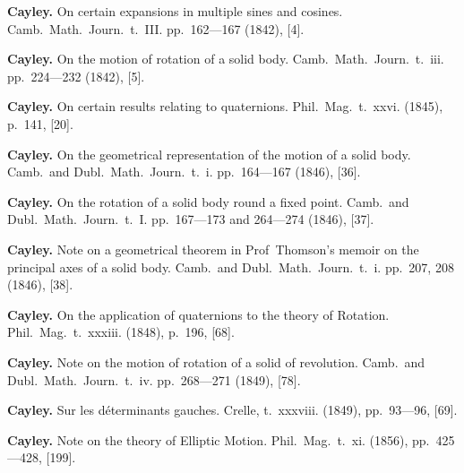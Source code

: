 \documentclass[11pt,a4paper]{book}
\begin{document}
\vspace{0.5em}

\noindent\textbf{Cayley.} On certain expansions in multiple sines and cosines. Camb.~Math.~Journ.~t.~III. pp.~162---167 (1842), [4].

\vspace{0.5em}

\noindent\textbf{Cayley.} On the motion of rotation of a solid body. Camb.~Math.~Journ.~t.~iii. pp.~224---232 (1842), [5].

\vspace{0.5em}

\noindent\textbf{Cayley.} On certain results relating to quaternions. Phil.~Mag.~t.~xxvi. (1845), p.~141, [20].

\vspace{0.5em}

\noindent\textbf{Cayley.} On the geometrical representation of the motion of a solid body. Camb.~and Dubl.~Math.~Journ.~t.~i. pp.~164---167 (1846), [36].

\vspace{0.5em}

\noindent\textbf{Cayley.} On the rotation of a solid body round a fixed point. Camb.~and Dubl.~Math.~Journ.~t.~I. pp.~167---173 and 264---274 (1846), [37].

\vspace{0.5em}

\noindent\textbf{Cayley.} Note on a geometrical theorem in Prof~Thomson's memoir on the principal axes of a solid body. Camb.~and Dubl.~Math.~Journ.~t.~i. pp.~207, 208 (1846), [38].

\vspace{0.5em}

\noindent\textbf{Cayley.} On the application of quaternions to the theory of Rotation. Phil.~Mag.~t.~xxxiii. (1848), p.~196, [68].

\vspace{0.5em}

\noindent\textbf{Cayley.} Note on the motion of rotation of a solid of revolution. Camb.~and Dubl.~Math.~Journ.~t.~iv. pp.~268---271 (1849), [78].

\vspace{0.5em}

\noindent\textbf{Cayley.} Sur les d\'{e}terminants gauches. Crelle, t.~xxxviii. (1849), pp.~93---96, [69].

\vspace{0.5em}

\noindent\textbf{Cayley.} Note on the theory of Elliptic Motion. Phil.~Mag.~t.~xi. (1856), pp.~425---428, [199].
\end{document}
